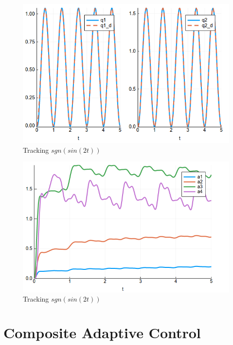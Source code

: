 \documentclass[12pt]{article}
\begin{document}
\begin{figure}[h]
    \centering
    \includegraphics[width=3.5in\textsize]{arm_trajectory_tracking2.png}
    \caption{Tracking $sgn(sin(2t))$}
    \label{fig:arm2}
\end{figure}

\begin{figure}[h]
    \centering
    \includegraphics[width=3.5in\textsize]{arm_parameter_estimates.png}
    \caption{Tracking $sgn(sin(2t))$}
    \label{fig:arm_param}
\end{figure}

\section{Composite Adaptive Control}
\end{document}

